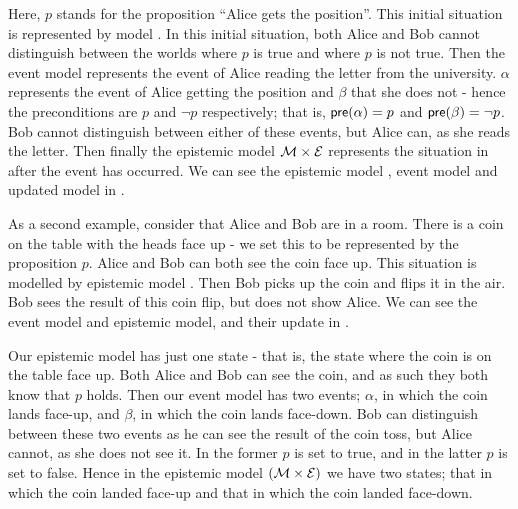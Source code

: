 \documentclass[10pt, a4paper]{report}
\begin{document}
Here, $p$ stands for the proposition ``Alice gets the position''. This initial
situation is represented by model . In this initial situation, both Alice
and Bob cannot distinguish between the worlds where $p$ is true and where $p$ is
not true. Then the event model  represents the event of Alice reading the letter
from the university. $\alpha$ represents the event of Alice getting the position
and $\beta$ that she does not - hence the preconditions are $p$ and $\neg
p$ respectively; that is, $\textsf{pre}(\alpha) = p$ and $\textsf{pre}(\beta) = \neg p$. Bob
cannot distinguish between either of these events, but Alice can, as she reads
the letter. Then finally the epistemic model $\mathcal{M} \times \mathcal{E}$ represents the situation
in  after the event  has occurred. We can see the epistemic model ,
event model  and updated model  in .

As a second example, consider that Alice and Bob are in a room. There is a coin
on the table with the heads face up - we set this to be represented by the
proposition $p$. Alice and Bob can both see the coin face up. This situation is
modelled by epistemic model . Then Bob picks up the coin and flips it in
the air. Bob sees the result of this coin flip, but does not show Alice. We can
see the event model and epistemic model, and their update in
.

Our epistemic model has just one state - that is, the state where the coin is on
the table face up. Both Alice and Bob can see the coin, and as such they both
know that $p$ holds. Then our event model has two events; $\alpha$, in which the
coin lands face-up, and $\beta$, in which the coin lands face-down. Bob can
distinguish between these two events as he can see the result of the coin toss,
but Alice cannot, as she does not see it. In the former $p$ is set to true,
and in the latter $p$ is set to false. Hence in the epistemic model $(\mathcal{M}
\times \mathcal{E})$ we have two states; that in which the coin landed face-up and
that in which the coin landed face-down.
\end{document}
